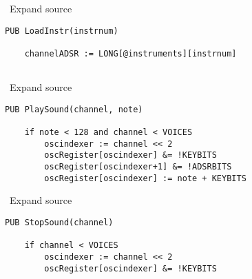 
\textbf{} ~Expand source

\lstset{style=spin}
\begin{lstlisting}
PUB LoadInstr(instrnum)

    channelADSR := LONG[@instruments][instrnum]
  
\end{lstlisting}


\textbf{} ~Expand source

\lstset{style=spin}
\begin{lstlisting}
PUB PlaySound(channel, note)

    if note < 128 and channel < VOICES
        oscindexer := channel << 2
        oscRegister[oscindexer] &= !KEYBITS          
        oscRegister[oscindexer+1] &= !ADSRBITS
        oscRegister[oscindexer] := note + KEYBITS
\end{lstlisting}


\textbf{} ~Expand source

\lstset{style=spin}
\begin{lstlisting}
PUB StopSound(channel)

    if channel < VOICES
        oscindexer := channel << 2          
        oscRegister[oscindexer] &= !KEYBITS 
\end{lstlisting}


